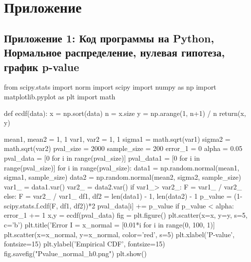 \documentclass[12pt]{disser}
\begin{document}
\clearpage
\section*{Приложение}

\subsection*{Приложение 1: Код программы на Python, Нормальное распределение, нулевая гипотеза, график p-value}
\begin{python}
from scipy.stats import norm
import scipy
import numpy as np
import matplotlib.pyplot as plt
import math

def ecdf(data):
    x = np.sort(data)
    n = x.size
    y = np.arange(1, n+1) / n
    return(x, y)


mean1, mean2 = 1, 1
var1, var2 = 1, 1
sigma1 = math.sqrt(var1)
sigma2 = math.sqrt(var2)
pval_size = 2000
sample_size = 200
error_1 = 0
alpha = 0.05
pval_data = [0 for i in range(pval_size)]
pval_data1 = [0 for i in range(pval_size)]
for i in range(pval_size):
    data1 = np.random.normal(mean1, sigma1, sample_size)
    data2 = np.random.normal(mean2, sigma2, sample_size)
    var1_ = data1.var()
    var2_ = data2.var()
    if var1_> var2_:
        F = var1_ / var2_
    else:
        F = var2_ / var1_
    df1, df2 = len(data1) - 1, len(data2) - 1
    p_value = (1-scipy.stats.f.cdf(F, df1, df2))*2
    pval_data[i] += p_value
    if p_value < alpha:
        error_1 += 1
x,y = ecdf(pval_data)
fig = plt.figure()
plt.scatter(x=x, y=y, s=5, c='b')
plt.title('Error I = %
x_normal = [0.01*i for i in range(0, 100, 1)]
plt.scatter(x=x_normal, y=x_normal, color='red', s=5)
plt.xlabel('P-value', fontsize=15)
plt.ylabel('Empirical CDF', fontsize=15)
fig.savefig("Pvalue_normal_h0.png")
plt.show()
\end{python}
\end{document}

